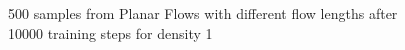 \documentclass[runningheads]{llncs}
\begin{document}
\begin{figure}
	\centering
	\\
	\\
	\caption{500 samples from Planar Flows with different flow lengths after 10000 training steps for density 1}
	\label{fig:density1}
\end{figure}
\end{document}
